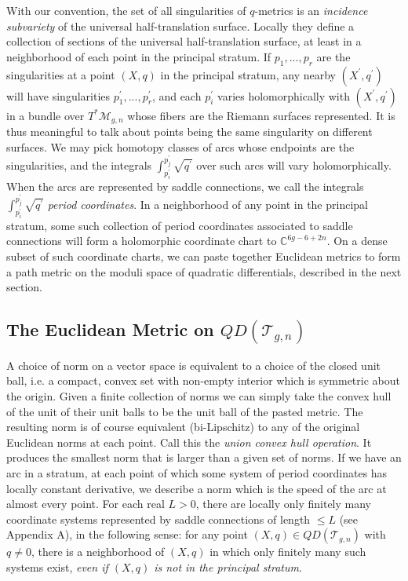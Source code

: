 \documentclass[12pt]{article}
\newcommand{\cc}{\mathbb{C}}
\begin{document}
\noindent With our convention, the set of all singularities of $q$-metrics is an \emph{incidence subvariety} of the universal half-translation surface. Locally they define a collection of sections of the universal half-translation surface, at least in a neighborhood of each point in the principal stratum. If $p_1,...,p_r$ are the singularities at a point $(X,q)$ in the principal stratum, any nearby $(X^\prime,q^\prime)$ will have singularities $p_1^\prime,...,p_r^\prime$, and each $p_i^\prime$ varies holomorphically with $(X^\prime,q^\prime)$ in a bundle over $T^*\mathcal{M}_{g,n}$ whose fibers are the Riemann surfaces represented. It is thus meaningful to talk about points being the same singularity on different surfaces. We may pick homotopy classes of arcs whose endpoints are the singularities, and the integrals $\int_{p_i^\prime}^{p_j^\prime} \sqrt{q^\prime}$ over such arcs will vary holomorphically. When the arcs are represented by saddle connections, we call the integrals $\int_{p_i^\prime}^{p_j^\prime} \sqrt{q^\prime}$ \emph{period coordinates}. In a neighborhood of any point in the principal stratum, some such collection of period coordinates associated to saddle connections will form a holomorphic coordinate chart to $\cc^{6g-6+2n}.$ On a dense subset of such coordinate charts, we can paste together Euclidean metrics to form a path metric on the moduli space of quadratic differentials, described in the next section.

\subsection{The Euclidean Metric on $QD(\mathcal{T}_{g,n})$}

\noindent A choice of norm on a vector space is equivalent to a choice of the closed unit ball, i.e. a compact, convex set with non-empty interior which is symmetric about the origin. Given a finite collection of norms we can simply take the convex hull of the unit of their unit balls to be the unit ball of the pasted metric. The resulting norm is of course equivalent (bi-Lipschitz) to any of the original Euclidean norms at each point. Call this the \emph{union convex hull operation}. It produces the smallest norm that is larger than a given set of norms. If we have an arc in a stratum, at each point of which some system of period coordinates has locally constant derivative, we describe a norm which is the speed of the arc at almost every point. For each real $L > 0$, there are locally only finitely many coordinate systems represented by saddle connections of length $\leq L$ (see Appendix A), in the following sense: for any point $(X,q) \in QD(\mathcal{T}_{g,n})$ with $q \neq 0$, there is a neighborhood of $(X,q)$ in which only finitely many such systems exist, \emph{even if $(X,q)$ is not in the principal stratum}.\\
\end{document}
